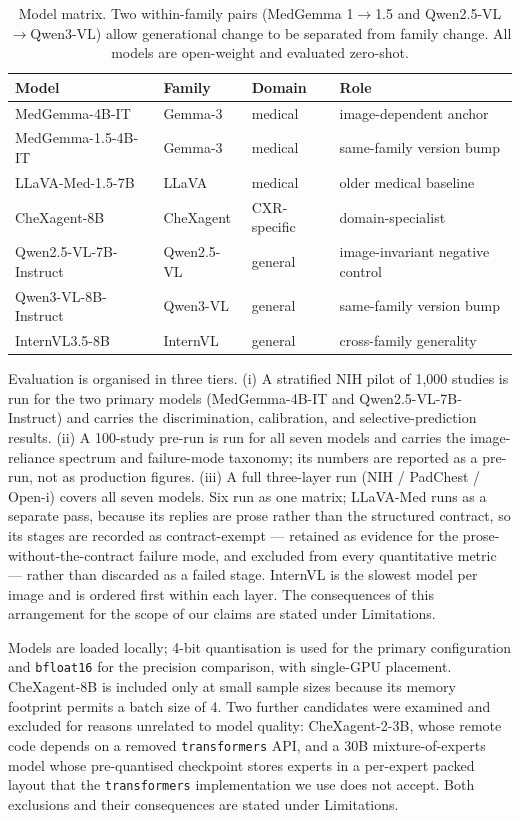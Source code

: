 \begin{table}[t]
\centering
\small
\begin{tabular}{llll}
\hline
Model & Family & Domain & Role \\
\hline
MedGemma-4B-IT & Gemma-3 & medical & image-dependent anchor \\
MedGemma-1.5-4B-IT & Gemma-3 & medical & same-family version bump \\
LLaVA-Med-1.5-7B & LLaVA & medical & older medical baseline \\
CheXagent-8B & CheXagent & CXR-specific & domain-specialist \\
Qwen2.5-VL-7B-Instruct & Qwen2.5-VL & general & image-invariant negative control \\
Qwen3-VL-8B-Instruct & Qwen3-VL & general & same-family version bump \\
InternVL3.5-8B & InternVL & general & cross-family generality \\
\hline
\end{tabular}
\caption{Model matrix. Two within-family pairs (MedGemma 1$\rightarrow$1.5 and
Qwen2.5-VL$\rightarrow$Qwen3-VL) allow generational change to be separated from
family change. All models are open-weight and evaluated zero-shot.}
\label{tab:models}
\end{table}

Evaluation is organised in three tiers. (i) A stratified NIH pilot of 1,000
studies is run for the two primary models (MedGemma-4B-IT and
Qwen2.5-VL-7B-Instruct) and carries the discrimination, calibration, and
selective-prediction results. (ii) A 100-study pre-run is run for all seven
models and carries the image-reliance spectrum and failure-mode taxonomy; its
numbers are reported as a pre-run, not as production figures. (iii) A full
three-layer run (NIH / PadChest / Open-i) covers all seven models. Six run as one
matrix; LLaVA-Med runs as a separate pass, because its replies are prose rather
than the structured contract, so its stages are recorded as contract-exempt ---
retained as evidence for the prose-without-the-contract failure mode, and excluded
from every quantitative metric --- rather than discarded as a failed stage.
InternVL is the slowest model per image and is ordered first within each layer.
The consequences of this arrangement for the scope of our claims are stated under
Limitations.

Models are loaded locally; 4-bit quantisation is used for the primary
configuration and \texttt{bfloat16} for the precision comparison, with
single-GPU placement. CheXagent-8B is included only at small sample sizes
because its memory footprint permits a batch size of 4. Two further candidates
were examined and excluded for reasons unrelated to model quality: CheXagent-2-3B,
whose remote code depends on a removed \texttt{transformers} API, and a 30B
mixture-of-experts model whose pre-quantised checkpoint stores experts in a
per-expert packed layout that the \texttt{transformers} implementation we use
does not accept. Both exclusions and their consequences are stated under
Limitations.

